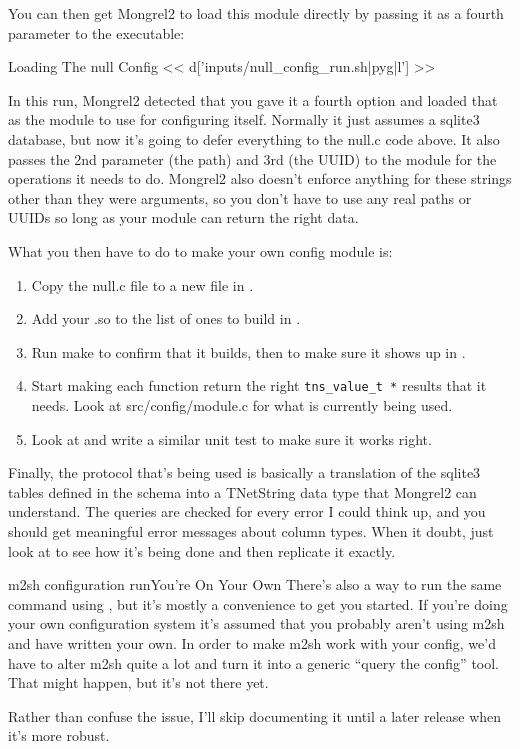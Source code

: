 You can then get Mongrel2 to load this module directly by passing it as a
fourth parameter to the  executable:

\begin{code}{Loading The null Config}
<< d['inputs/null_config_run.sh|pyg|l'] >>
\end{code}

In this run, Mongrel2 detected that you gave it a fourth option and 
loaded that as the module to use for configuring itself.  Normally
it just assumes a sqlite3 database, but now it's going to defer
everything to the null.c code above.  It also passes the 2nd parameter
(the path) and 3rd (the UUID) to the module for the operations it
needs to do.  Mongrel2 also doesn't enforce anything for these strings
other than they were arguments, so you don't have to use any real paths
or UUIDs so long as your module can return the right data.

What you then have to do to make your own config module is:

\begin{enumerate}
\item Copy the null.c file to a new file in .
\item Add your .so to the list of ones to build in .
\item Run make to confirm that it builds, then  to make sure it shows up in .
\item Start making each function return the right \verb|tns_value_t *| results that
it needs.  Look at src/config/module.c for what is currently being used.
\item Look at  and write a similar unit test to make sure it works right.
\end{enumerate}

Finally, the protocol that's being used is basically a translation of the sqlite3 tables
defined in the  schema into a TNetString data type that
Mongrel2 can understand.  The queries are checked for every error I could think up, and
you should get meaningful error messages about column types.  When it doubt, just
look at  to see how it's being done and then replicate it exactly.

\begin{aside}{m2sh configuration run}{You're On Your Own}
There's also a way to run the same command using , but it's
mostly a convenience to get you started.  If you're doing your own
configuration system it's assumed that you probably aren't using
m2sh and have written your own.  In order to make m2sh work with your
config, we'd have to alter m2sh quite a lot and turn it into a generic
``query the config'' tool.  That might happen, but it's not there yet.

Rather than confuse the issue, I'll skip documenting it until a later
release when it's more robust.
\end{aside}

